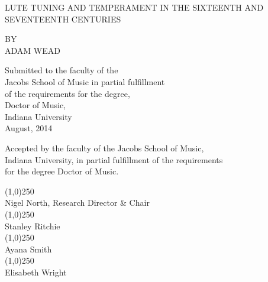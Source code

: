 \begin{titlepage}
  \begin{center}
    \vspace*{1cm}
    
    LUTE TUNING AND TEMPERAMENT IN THE SIXTEENTH AND SEVENTEENTH CENTURIES
    
    \vspace{1.5cm}
    
    BY\\
    ADAM WEAD\\
    
    \vfill
    
    \begin{centerblocks}
      Submitted to the faculty of the\\
      Jacobs School of Music in partial fulfillment\\
      of the requirements for the degree,\\
      Doctor of Music,\\ 
      Indiana University\\ 
      August, 2014\\
    \end{centerblocks}
    
    
  \end{center}
\end{titlepage}

\setcounter{page}{2}

\null
\vfill

\begin{centerblocks}
Accepted by the faculty of the Jacobs School of Music,\\
Indiana University, in partial fulfillment of the requirements\\
for the degree Doctor of Music.\\
\end{centerblocks}

\null
\vfill

\begin{blocks}
\hfill \line(1,0){250}\\
\hfill Nigel North, Research Director \& Chair\\
\vspace*{2\baselineskip}
\hfill \line(1,0){250}\\
\hfill Stanley Ritchie\\
\vspace*{2\baselineskip}
\hfill \line(1,0){250}\\
\hfill Ayana Smith\\
\vspace*{2\baselineskip}
\hfill \line(1,0){250}\\
\hfill Elisabeth Wright\\
\end{blocks}
